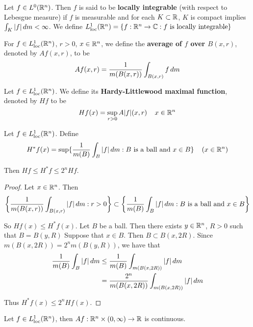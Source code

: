 \documentclass{book}
\begin{document}
	\begin{defn}  
		Let $f \in L^0(\mathbb{R}^n)$. Then $f$ is said to be \textbf{locally integrable} (with respect to Lebesgue measure) if $f$ is measurable and for each $K \subset \mathbb{R}$, $K$ is compact implies $\int_K |f| \, d m < \infty$. We define $L^1_{\text{loc}}(\mathbb{R}^n) = \{f:\mathbb{R}^n \rightarrow \mathbb{C}: f \text{ is locally integrable}\}$
	\end{defn}
	
	\begin{defn}  
		For $f \in L^1_{\text{loc}}(\mathbb{R}^n)$, $r>0$, $x \in \mathbb{R}^n$, we define the \textbf{average of $f$ over $B(x,r)$}, denoted by $Af(x,r)$, to be $$Af(x,r) = \frac{1}{m(B(x,r))}\int_{B(x,r)}f\, d m$$
	\end{defn}

	\begin{defn}  
		Let $f \in L^1_{\text{loc}}(\mathbb{R}^n)$. We define its \textbf{Hardy-Littlewood maximal function}, denoted by $Hf$ to be $$Hf(x) = \sup_{r>0} A|f|(x,r) \hspace{4mm} x \in \mathbb{R}^n$$
	\end{defn}
	
	\begin{ex}  
		Let $f \in L^1_{\text{loc}}(\mathbb{R}^n)$. Define $$H^*f(x) = \sup\{\frac{1}{m(B)}\int_{B}|f|\, d m: B \text{ is a ball and } x \in B\} \hspace{4mm} (x \in \mathbb{R}^n)$$
		
		Then $Hf \leq H^*f \leq 2^n Hf$. 
	\end{ex}
	
	\begin{proof}
		Let $x \in \mathbb{R}^n$. Then $$\bigg \{ \frac{1}{m(B(x,r))}\int_{B(x,r)}|f|\, d m: r >0\bigg \} \subset \bigg\{ \frac{1}{m(B)}\int_{B}|f|\, d m: B \text{ is a ball and } x \in B \bigg\} $$
		
		So $Hf(x) \leq H^*f(x)$. Let $B$ be a ball. Then there exists $y \in \mathbb{R}^n$, $R>0$ such that $B = B(y,R)$ Suppose that $x \in B$. Then $B \subset B(x,2R)$. Since $m(B(x,2R)) = 2^n m(B(y,R))$, we have that 
		\begin{align*}
			\frac{1}{m(B)}\int_{B}|f|\, d m
			& \leq \frac{1}{m(B)} \int_{m(B(x,2R))}|f|\, d m\\
			&= \frac{2^n}{m(B(x,2R))} \int_{m(B(x,2R))}|f|\, d m
		\end{align*}
		
		Thus $H^*f(x) \leq 2^n Hf(x)$.
	\end{proof}
	
	\begin{lem}
		Let $f \in L^1_{\text{loc}}(\mathbb{R}^n)$, then $Af:\mathbb{R}^n \times (0, \infty)\rightarrow \mathbb{R}$ is continuous.
	\end{lem}
	
\end{document}
